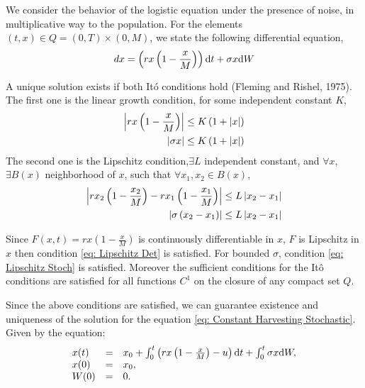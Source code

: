 We consider the behavior of the logistic equation under the presence of noise, in multiplicative way to the population. For the elements $(t,x)\in Q=(0, T)\times(0, M)$, we state the following differential equation,
\begin{equation}
	dx=\left(rx\left(1-\frac{x}{M}\right)\right)\mathrm{d} t+\sigma x\mathrm{d} W \label{eq: Constant Harvesting Stochastic}
\end{equation}

A unique solution exists if both It\'o conditions hold (Fleming and Rishel, 1975). The first one is the linear growth condition, for some independent constant $K$,
\begin{align}
	\left|rx\left(1-\frac{x}{M}\right)\right|&\leq K\left(1+\left|x\right|\right) \label{eq: LinearGrowth Det}\\
	\left|\sigma x\right|&\leq K\left(1+\left|x\right|\right) \label{eq: LinearGrowth Stoch}
\end{align}
The second one is the Lipschitz condition,$\exists L$ independent constant, and $\forall x$, $\exists B(x)$ neighborhood of $x$, such that $\forall x_1, x_2 \in B(x)$,
\begin{align}
\left|rx_2\left(1-\frac{x_2}{M}\right)-rx_1\left(1-\frac{x_1}{M}\right)\right|&\leq L \left|x_2-x_1\right| \label{eq: Lipschitz Det}\\
\left|\sigma\left(x_2-x_1\right)\right| &\leq L \left|x_2-x_1\right| \label{eq: Lipschitz Stoch}
\end{align}

Since $F(x,t)=rx\left(1-\frac{x}{M}\right)$ is continuously differentiable in $x$, $F$ is Lipschitz in $x$ then condition \ref{eq: Lipschitz Det} is satisfied. For bounded $\sigma$, condition \ref{eq: Lipschitz Stoch} is satisfied. Moreover the sufficient conditions for the It\^o conditions are satisfied for all functions $C^1$ on the closure of any compact set $Q$.

Since the above conditions are satisfied, we can guarantee existence and uniqueness of the solution for the equation \ref{eq: Constant Harvesting Stochastic}. Given by the equation:
\begin{equation}
\begin{array}{lll}
	x(t)&=&x_0+\int_{0}^{t}\left(rx\left(1-\frac{x}{M}\right)-u\right)\mathrm{d} t + \int_{0}^{t}\sigma x \mathrm{d} W,\\
	x(0)&=&x_0, \\
	W(0)&=&0.
\end{array}
\end{equation}


